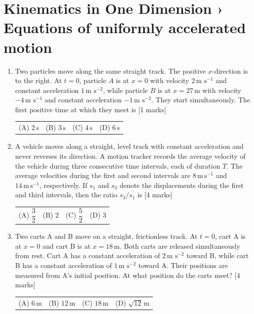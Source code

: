 \documentclass[11pt,a4paper]{article}
\begin{document}
\section*{Kinematics in One Dimension › Equations of uniformly accelerated motion}
\begin{enumerate}[resume]
\item Two particles move along the same straight track. The positive $x$-direction is to the right. At $t=0$, particle $A$ is at $x=0$ with velocity $2\,\text{m s}^{-1}$ and constant acceleration $1\,\text{m s}^{-2}$, while particle $B$ is at $x=27\,\text{m}$ with velocity $-4\,\text{m s}^{-1}$ and constant acceleration $-1\,\text{m s}^{-2}$. They start simultaneously. The first positive time at which they meet is \hfill [1 marks]
{\renewcommand{\arraystretch}{1.8}
\begin{tabularx}{\linewidth}{X X X X}
(A) \quad $2\,\text{s}$ & (B) \quad $3\,\text{s}$ & (C) \quad $4\,\text{s}$ & (D) \quad $6\,\text{s}$ \\[10pt]
\end{tabularx}}
\item A vehicle moves along a straight, level track with constant acceleration and never reverses its direction. A motion tracker records the average velocity of the vehicle during three consecutive time intervals, each of duration $T$. The average velocities during the first and second intervals are $8\,\mathrm{m\,s^{-1}}$ and $14\,\mathrm{m\,s^{-1}}$, respectively. If $s_1$ and $s_3$ denote the displacements during the first and third intervals, then the ratio $s_3/s_1$ is \hfill [4 marks]
{\renewcommand{\arraystretch}{1.8}
\begin{tabularx}{\linewidth}{X X X X}
(A) \quad $\dfrac{3}{2}$ & (B) \quad $2$ & (C) \quad $\dfrac{5}{2}$ & (D) \quad $3$ \\[10pt]
\end{tabularx}}
\item Two carts A and B move on a straight, frictionless track. At $t=0$, cart A is at $x=0$ and cart B is at $x=18\,\text{m}$. Both carts are released simultaneously from rest. Cart A has a constant acceleration of $2\,\text{m s}^{-2}$ toward B, while cart B has a constant acceleration of $1\,\text{m s}^{-2}$ toward A. Their positions are measured from A's initial position. At what position do the carts meet? \hfill [4 marks]
{\renewcommand{\arraystretch}{1.8}
\begin{tabularx}{\linewidth}{X X X X}
(A) \quad $6\,\text{m}$ & (B) \quad $12\,\text{m}$ & (C) \quad $18\,\text{m}$ & (D) \quad $\sqrt{12}\,\text{m}$ \\[10pt]

\end{tabularx}}
\end{enumerate}
\end{document}

